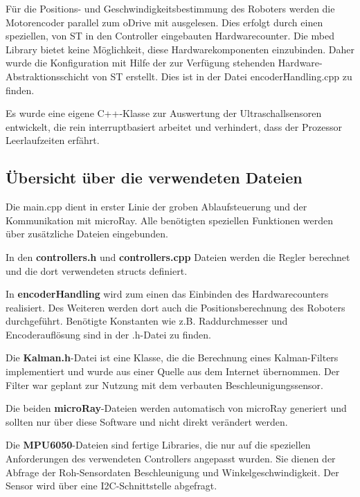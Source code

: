 \par\bigskip
Für die Positions- und Geschwindigkeitsbestimmung des Roboters werden die Motorencoder parallel zum oDrive mit ausgelesen. Dies erfolgt durch einen speziellen, von ST in den Controller eingebauten Hardwarecounter. Die mbed Library bietet keine Möglichkeit, diese Hardwarekomponenten einzubinden. Daher wurde die Konfiguration mit Hilfe der zur Verfügung stehenden Hardware-Abstraktionsschicht von ST erstellt. Dies ist in der Datei encoderHandling.cpp zu finden.


\par\bigskip
Es wurde eine eigene C++-Klasse zur Auswertung der Ultraschallsensoren entwickelt, die rein interruptbasiert arbeitet und verhindert, dass der Prozessor Leerlaufzeiten erfährt.

\subsection{Übersicht über die verwendeten Dateien}
Die main.cpp dient in erster Linie der groben Ablaufsteuerung und der Kommunikation mit microRay. Alle benötigten speziellen Funktionen werden über zusätzliche Dateien eingebunden.

\par\bigskip
In den \textbf{controllers.h} und \textbf{controllers.cpp} Dateien werden die Regler berechnet und die dort verwendeten structs definiert.

\par\bigskip
In \textbf{encoderHandling} wird zum einen das Einbinden des Hardwarecounters realisiert. Des Weiteren werden dort auch die Positionsberechnung des Roboters durchgeführt. Benötigte Konstanten wie z.B. Raddurchmesser und Encoderauflösung sind in der .h-Datei zu finden.

\par\bigskip
Die \textbf{Kalman.h}-Datei ist eine Klasse, die die Berechnung eines Kalman-Filters implementiert und wurde aus einer Quelle aus dem Internet übernommen. Der Filter war geplant zur Nutzung mit dem verbauten Beschleunigungssensor.

\par\bigskip
Die beiden \textbf{microRay}-Dateien werden automatisch von microRay generiert und sollten nur über diese Software und nicht direkt verändert werden.

\par\bigskip
Die \textbf{MPU6050}-Dateien sind fertige Libraries, die nur auf die speziellen Anforderungen des verwendeten Controllers angepasst wurden. Sie dienen der Abfrage der Roh-Sensordaten Beschleunigung und Winkelgeschwindigkeit. Der Sensor wird über eine I2C-Schnittstelle abgefragt.

